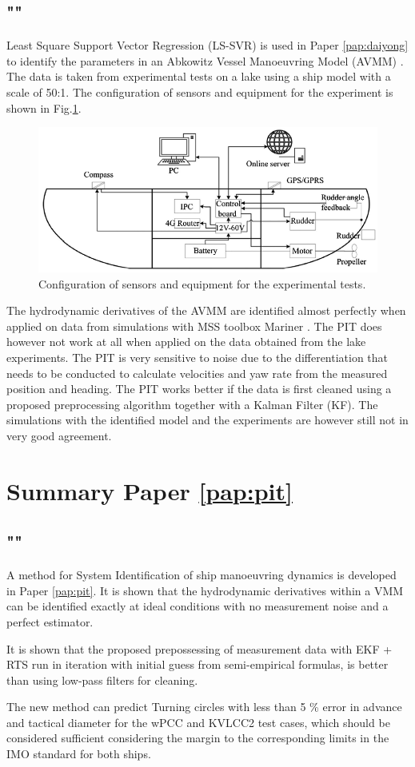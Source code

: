 \subsection*{""}
Least Square Support Vector Regression (LS-SVR) \cite{brereton_support_2010} is used in Paper \ref{pap:daiyong} to identify the parameters in an Abkowitz Vessel Manoeuvring Model (AVMM) \cite{abkowitz_ship_1964}.  
The data is taken from experimental tests on a lake using a ship model with a scale of 50:1. The configuration of sensors and equipment for the experiment is shown in Fig.\ref{fig:cthmodel}.  
\begin{figure}[H]
    \centering
    \includegraphics[width=\textwidth]{kappa/images/cth_model.png}
    \caption{Configuration of sensors and equipment for the experimental tests.}
    \label{fig:cthmodel}
\end{figure}
\noindent The hydrodynamic derivatives of the AVMM are identified almost perfectly when applied on data from simulations with MSS toolbox Mariner \cite{tristan_matlab_2009}. The PIT does however not work at all when applied on the data obtained from the lake experiments. The PIT is very sensitive to noise due to the differentiation that needs to be conducted to calculate velocities and yaw rate from the measured position and heading. The PIT works better if the data is first cleaned using a proposed preprocessing algorithm together with a Kalman Filter (KF). The simulations with the identified model and the experiments are however still not in very good agreement.     

\section{Summary Paper \ref{pap:pit}}
\subsection*{""}
A method for System Identification of ship manoeuvring dynamics is developed in Paper \ref{pap:pit}. It is shown that the hydrodynamic derivatives within a VMM can be identified exactly at ideal conditions with no measurement noise and a perfect estimator.

It is shown that the proposed prepossessing of measurement data with EKF + RTS run in iteration with initial guess from semi-empirical formulas, is better than using low-pass filters for cleaning.

The new method can predict Turning circles with less than 5 \% error in advance and tactical diameter for the wPCC and KVLCC2 test cases, which should be considered sufficient considering the margin to the corresponding limits in the IMO standard for both ships.